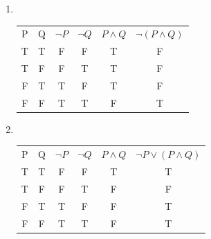 \documentclass[12pt]{exam}
\begin{document}
\begin{enumerate}
\begin{enumerate}
            \item ~\\
            
                \begin{table}[h]
                    \centering 
                    \label{tab:example_table}
                    
                    \begin{tabular}{cccccc}
                        
                        P & Q & $ \lnot P $ & $ \lnot Q $ & $  P \land  Q $ & $ \lnot (  P \land  Q ) $  \\
                        
                        T       & T       & F       & F       & T       & F       \\
                        T       & F       & F       & T       & T       & F       \\
                        F       & T       & T       & F       & T       & F       \\
                        F       & F       & T       & T       & F       & T       \\
                        
                        
                    \end{tabular}
                \end{table}   
                            
            \item ~\\
            
                \begin{table}[h]
                    \centering 
                    \label{tab:example_table}
                    
                    \begin{tabular}{cccccc}
                        
                        P & Q & $ \lnot P $ & $ \lnot Q $ & $ P \land  Q $ & $ \lnot P \lor ( P \land  Q ) $ \\
                        
                        T       & T       & F       & F       & T       & T       \\
                        T       & F       & F       & T       & F       & F       \\
                        F       & T       & T       & F       & F       & T       \\
                        F       & F       & T       & T       & F       & T       \\
                        
                        
                    \end{tabular}
                \end{table}   
                            
        \end{enumerate}

\end{enumerate}
\end{document}
